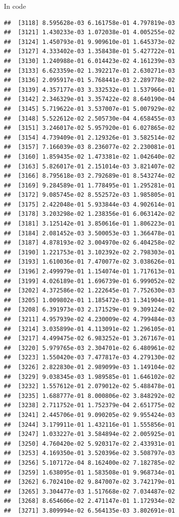 \documentclass[ignorenonframetext,]{beamer}
\begin{document}
\begin{frame}[fragile]{In code}
\begin{verbatim}
##  [3118] 8.595628e-03 6.161758e-01 4.797819e-03
##  [3121] 1.430233e-03 1.072038e-01 4.005255e-02
##  [3124] 1.450793e-01 9.909610e-01 1.645373e-02
##  [3127] 4.333402e-03 1.358438e-01 5.427722e-01
##  [3130] 1.240988e-01 6.014423e-02 4.161239e-03
##  [3133] 6.623359e-02 1.392217e-01 2.630271e-03
##  [3136] 2.095917e-01 5.768441e-03 2.289778e-02
##  [3139] 4.357177e-03 3.332532e-01 1.537966e-01
##  [3142] 2.346329e-01 3.357422e-02 8.640190e-04
##  [3145] 5.719622e-01 3.537007e-01 5.007929e-02
##  [3148] 5.522612e-02 2.505730e-04 4.658455e-03
##  [3151] 3.246017e-02 5.957920e-01 6.027865e-02
##  [3154] 4.739409e-01 2.129326e-01 3.582514e-02
##  [3157] 7.166039e-03 8.236077e-02 2.230081e-01
##  [3160] 1.859435e-02 1.473381e-02 1.042640e-02
##  [3163] 5.826017e-01 2.151014e-03 3.821407e-02
##  [3166] 8.795618e-03 2.792689e-01 8.543274e-02
##  [3169] 9.284589e-01 1.778495e-01 1.295281e-01
##  [3172] 9.085745e-02 8.552572e-03 1.985805e-01
##  [3175] 2.422048e-01 5.933844e-03 4.902614e-01
##  [3178] 3.203298e-02 1.238356e-01 6.063142e-02
##  [3181] 3.125142e-01 3.850616e-01 1.806223e-01
##  [3184] 2.081452e-03 3.500053e-03 1.366478e-01
##  [3187] 4.878193e-02 3.004970e-02 6.404258e-02
##  [3190] 1.221753e-01 3.102392e-02 2.798303e-01
##  [3193] 1.610036e-01 7.470077e-02 3.038626e-01
##  [3196] 2.499979e-01 1.154074e-01 1.717613e-01
##  [3199] 4.026189e-01 1.696739e-01 6.999052e-02
##  [3202] 4.372586e-02 1.222645e-01 7.752630e-03
##  [3205] 1.009802e-01 1.185472e-03 1.341904e-01
##  [3208] 6.391973e-03 2.171529e-01 9.309124e-02
##  [3211] 4.957939e-02 4.230009e-02 4.799484e-03
##  [3214] 3.035899e-01 4.113091e-02 1.296105e-01
##  [3217] 4.499475e-02 6.983252e-01 3.267167e-01
##  [3220] 5.979765e-03 2.304701e-02 6.480961e-02
##  [3223] 1.550420e-03 7.477817e-03 4.279130e-02
##  [3226] 2.822830e-01 2.989099e-03 1.149104e-02
##  [3229] 9.038345e-03 1.989585e-01 1.646102e-02
##  [3232] 1.557612e-01 2.079012e-02 5.488478e-01
##  [3235] 1.688777e-01 8.000806e-02 3.848292e-02
##  [3238] 2.711752e-01 1.752379e-04 2.651775e-02
##  [3241] 2.445706e-01 9.090205e-02 9.955424e-03
##  [3244] 3.179911e-01 1.432116e-01 1.555856e-01
##  [3247] 1.033227e-01 3.584894e-02 2.005925e-01
##  [3250] 4.760420e-02 5.920317e-02 2.433931e-01
##  [3253] 4.169350e-01 3.520396e-02 3.508797e-03
##  [3256] 5.107172e-04 8.162400e-02 7.182785e-02
##  [3259] 1.638095e-01 1.583508e-01 9.968734e-01
##  [3262] 6.702410e-02 9.847007e-02 3.742179e-01
##  [3265] 3.304477e-03 1.517668e-02 7.034487e-02
##  [3268] 8.654606e-02 2.471147e-01 1.172934e-02
##  [3271] 3.809994e-02 6.564135e-03 3.802691e-01

\end{verbatim}
\end{frame}
\end{document}

